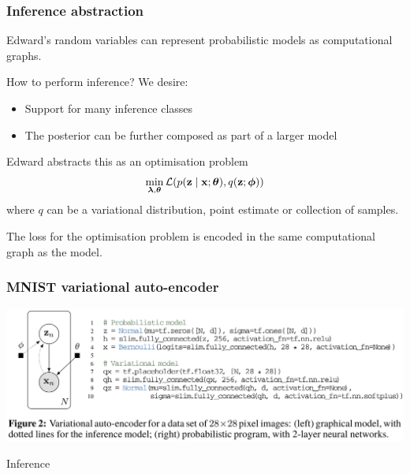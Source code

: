 \documentclass[10pt]{beamer}
\begin{document}
\begin{frame}
  \frametitle{Inference abstraction}
  Edward's random variables can represent probabilistic models as computational graphs.

  How to perform inference? We desire:
  \begin{itemize}
    \item Support for many inference classes
    \item The posterior can be further composed as part of a larger model
  \end{itemize}

  Edward abstracts this as an optimisation problem
  \begin{align*}
    \label{eq:inference-optimization}
    \min_{\boldsymbol{\mathbf{\lambda}},\boldsymbol{\mathbf{\theta}}}
    \mathcal{L}(
      p(\mathbf{z} \mid \mathbf{x}; \boldsymbol{\mathbf{\theta}}),
      q(\mathbf{z} ; \boldsymbol{\mathbf{\phi}})
    )
  \end{align*}
  where $q$ can be a variational distribution, point estimate or collection of samples.

  The loss for the optimisation problem is encoded in the same computational graph as the model.
\end{frame}


\begin{frame}
  \frametitle{MNIST variational auto-encoder}
  \includegraphics[width=\textwidth]{img/edward-vae.png}

  \begin{block}{Inference}
    \inputminted{python}{python/vae-inference.py}
  \end{block}
\end{frame}
\end{document}
